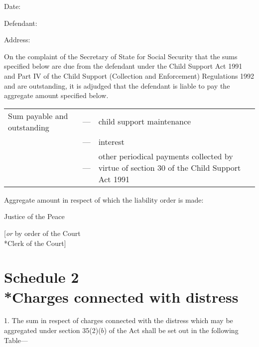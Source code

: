 \documentclass[a4paper]{article}
\newcommand{\parthead}{}
\begin{document}
\medskip

Date:

\medskip

Defendant:

\medskip

Address:

\medskip

On the complaint of the Secretary of State for Social Security that the sums specified below are due from the defendant under the Child Support Act 1991 and Part IV of the Child Support (Collection and Enforcement) Regulations 1992 and are outstanding, it is adjudged that the defendant is liable to pay the aggregate amount specified below.

\medskip

\noindent
\begin{tabulary}{0.9\linewidth}{lJJ}
Sum payable and outstanding \hspace{0.075\linewidth} &  --- & child support maintenance\\
&--- & interest\\
& --- & other periodical payments collected by virtue of section 30 of the Child Support Act 1991\\
\end{tabulary}

\medskip

Aggregate amount in respect of which the liability order is made:

\medskip

{\raggedleft Justice of the Peace

\medskip

[\emph{or} by order of the Court\\*Clerk of the Court]

}


\part[Schedule 2 --- Charges connected with distress]{Schedule 2\\*Charges connected with distress}

\renewcommand\parthead{--- Schedule 2}

1.  The sum in respect of charges connected with the distress which may be aggregated under section 35(2)($b$) of the Act shall be set out in the following Table—
\end{document}
